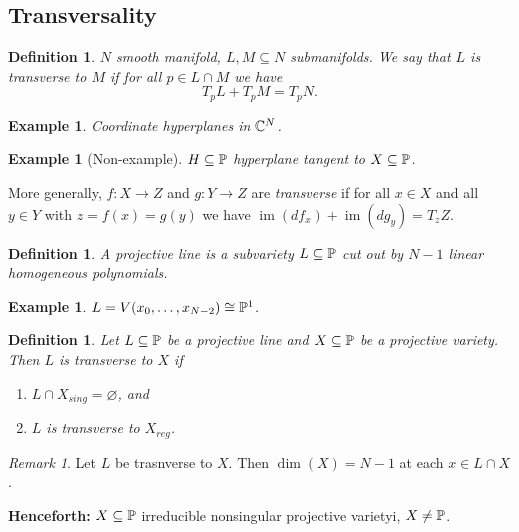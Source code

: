 \documentclass[A4paper, british, reqno]{amsart}
\theoremstyle{darkgreentheorem}
\theoremstyle{darkbluedefinition}
\newtheorem{defn}[thm]{Definition}
\theoremstyle{darkredexample}
\newtheorem{exa}[thm]{Example}
\theoremstyle{remark}
\newtheorem{rem}[thm]{Remark}
\DeclareMathOperator{\im}{im}
\newcommand{\1}{\mathbbm{1}}
\newcommand{\sub}{\subseteq}
\begin{document}
\subsection{Transversality}

\begin{defn}
    $N$ smooth manifold, $L,M\sub N$ submanifolds.
    We say that $L$ is \textit{transverse} to $M$ if for all $p\in L\cap M$ we have
    \[ T_{p}L+T_{p}M=T_{p}N. \]
\end{defn}

\begin{exa}
    Coordinate hyperplanes in $\C^{N}$.
\end{exa}

\begin{exa}[Non-example]
    $H\sub \P$ hyperplane tangent to $X\sub \P$.
\end{exa}

More generally, $f\colon X\to Z$ and $g\colon Y\to Z$ are \textit{transverse} if for all $x\in X$ and all $y\in Y$ with $z=f(x)=g(y)$ we have $\im(df_{x})+\im(dg_{y})=T_{z}Z$.

\begin{defn}
    A \textit{projective line} is a subvariety $L\sub \P$ cut out by $N-1$ linear homogeneous polynomials.
\end{defn}

\begin{exa}
    $L=V(x_{0},\ldots,x_{N-2})\cong \P^{1}$.
\end{exa}

\begin{defn}
    Let $L\sub \P$ be a projective line and $X\sub \P$ be a projective variety.
    Then $L$ is \textit{transverse to $X$} if
    \begin{enumerate}
	\item $L\cap X_{sing}=\varnothing$, and
	\item $L$ is transverse to $X_{reg}$.
    \end{enumerate}
\end{defn}

\begin{rem}
    Let $L$ be trasnverse to $X$.
    Then $\dim(X)=N-1$ at each $x\in L\cap X$.
\end{rem}

\textbf{Henceforth:} $X\sub \P$ irreducible nonsingular projective varietyi, $X\neq \P$.
\end{document}
